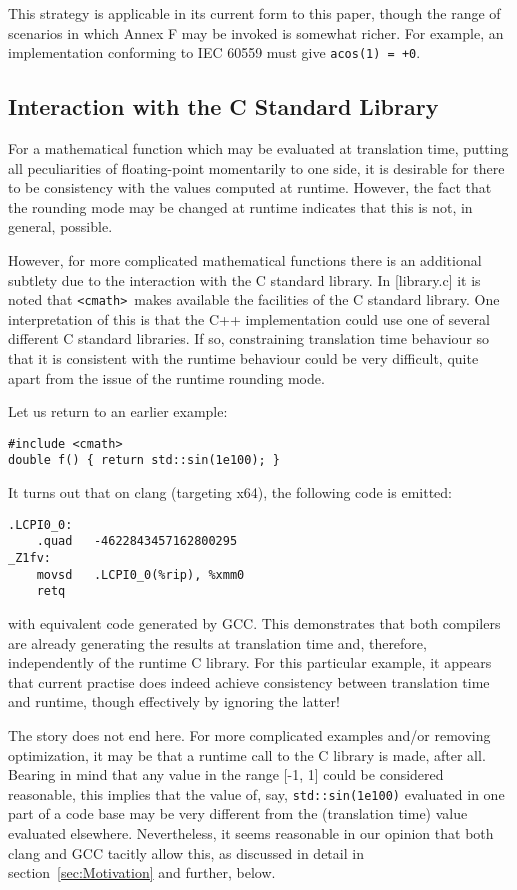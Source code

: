 \documentclass[prd,twocolumn,amsmath,amssymb,nofootinbib,eqsecnum]{revtex4-1}
\newcommand{\code}[1]{{\tt #1}}
\newcommand{\header}[1]{{\tt <#1>}}
\newcommand{\cmath}{\header{cmath}}
\newcommand{\sect}[1]{section~\ref{sec:#1}}
\begin{document}
This strategy is applicable in its current form to this paper, though the range of scenarios
in which Annex F may be invoked is somewhat richer. For example, an implementation
conforming to IEC 60559 must give \code{acos(1) = +0}.

\subsection{Interaction with the C Standard Library}

For a mathematical function which may be evaluated at translation time, 
putting all peculiarities of floating-point momentarily to one side, it is desirable for there to be
consistency with the values computed at runtime. However, the fact that the rounding mode
may be changed at runtime indicates that this is not, in general, possible. 

However, for more complicated mathematical functions there is an additional subtlety due
to the interaction with the C standard library. In [library.c] it is noted that \cmath\ makes available the facilities of the C standard library. One interpretation of this is that the C++
implementation could use one of several different C standard libraries. If so, 
constraining translation time behaviour so that it is consistent with the runtime behaviour
could be very difficult, quite apart from the issue of the runtime rounding mode.

Let us return to an earlier example:
\begin{Verbatim}
#include <cmath>
double f() { return std::sin(1e100); }
\end{Verbatim}
It turns out that on clang (targeting x64), the following code is emitted:
\begin{Verbatim}
.LCPI0_0:
	.quad	-4622843457162800295 
_Z1fv:
	movsd	.LCPI0_0(%rip), %xmm0
	retq
\end{Verbatim}
with equivalent code generated by GCC. This demonstrates that both compilers are already generating the results at translation time and, therefore, independently of the runtime C library. For this particular example, it appears that current practise does indeed achieve consistency between translation time and runtime, though effectively by ignoring the latter!

The story does not end here. For more complicated examples and/or removing optimization, it may be that a runtime call to the C library is made, after all. Bearing in mind that any value in the range [-1, 1] could be considered reasonable, this implies that the value of, say, \code{std::sin(1e100)} evaluated in one part of a code base may be very different from the (translation time) value evaluated elsewhere. 
Nevertheless, it seems reasonable in our opinion that both clang and GCC tacitly allow this, as discussed in detail in \sect{Motivation} and further, below.
\end{document}
